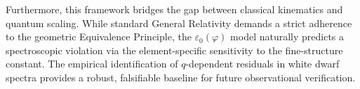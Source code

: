 \documentclass[reprint,amsmath,amssymb,aps,prd,twocolumn]{revtex4-2}
\begin{document}
Furthermore, this framework bridges the gap between classical kinematics and quantum scaling. While standard General Relativity demands a strict adherence to the geometric Equivalence Principle, the $\varepsilon_0(\varphi)$ model naturally predicts a spectroscopic violation via the element-specific sensitivity to the fine-structure constant. The empirical identification of $q$-dependent residuals in white dwarf spectra provides a robust, falsifiable baseline for future observational verification.
\end{document}
